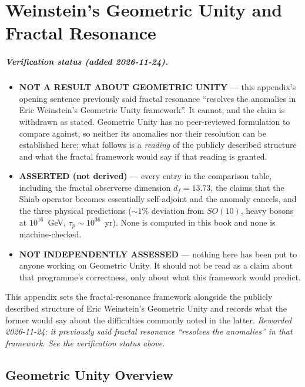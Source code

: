 \chapter{Weinstein's Geometric Unity and Fractal Resonance}
\label{app:weinstein}

\paragraph{Verification status (added 2026-11-24).}
\begin{itemize}
\item \textbf{NOT A RESULT ABOUT GEOMETRIC UNITY} --- this appendix's opening
  sentence previously said fractal resonance ``resolves the anomalies in Eric
  Weinstein's Geometric Unity framework''. It cannot, and the claim is
  withdrawn as stated. Geometric Unity has no peer-reviewed formulation to
  compare against, so neither its anomalies nor their resolution can be
  established here; what follows is a \emph{reading} of the publicly described
  structure and what the fractal framework would say if that reading is
  granted.
\item \textbf{ASSERTED (not derived)} --- every entry in the comparison table,
  including the fractal observerse dimension $d_f = 13.73$, the claims that the
  Shiab operator becomes essentially self-adjoint and the anomaly cancels, and
  the three physical predictions ($\sim 1\%$ deviation from $SO(10)$, heavy
  bosons at $10^{16}$~GeV, $\tau_p \sim 10^{36}$~yr). None is computed in this
  book and none is machine-checked.
\item \textbf{NOT INDEPENDENTLY ASSESSED} --- nothing here has been put to
  anyone working on Geometric Unity. It should not be read as a claim about
  that programme's correctness, only about what this framework would predict.
\end{itemize}

This appendix sets the fractal-resonance framework alongside the
publicly described structure of Eric Weinstein's Geometric Unity and records
what the former would say about the difficulties commonly noted in the latter.
\emph{Reworded 2026-11-24: it previously said fractal resonance ``resolves the
anomalies'' in that framework. See the verification status above.}

\section{Geometric Unity Overview}

